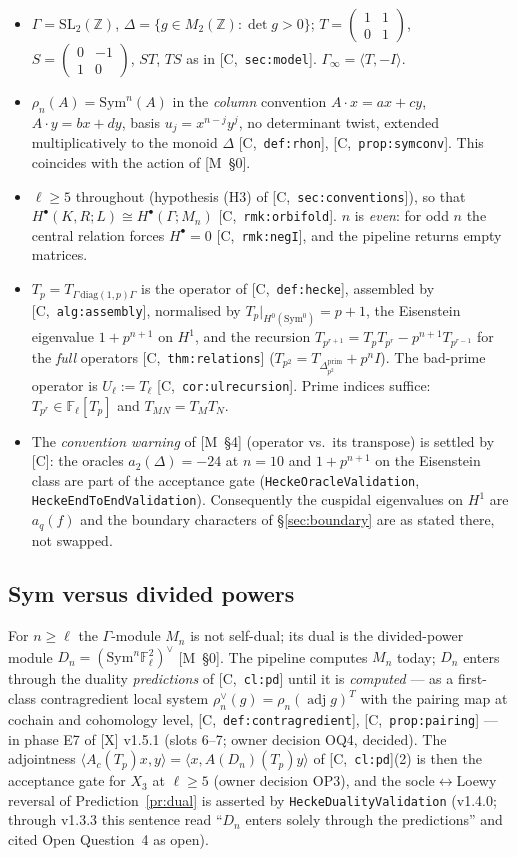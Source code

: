 \documentclass[11pt]{article}
\theoremstyle{remark}
\newcommand{\F}{\mathbb{F}}
\newcommand{\Z}{\mathbb{Z}}
\newcommand{\SL}{\mathrm{SL}}
\newcommand{\Sym}{\mathrm{Sym}}
\newcommand{\Ga}{\Gamma}
\newcommand{\De}{\Delta}
\newcommand{\Fl}{\F_\ell}
\newcommand{\smat}[4]{\begin{pmatrix} #1 & #2 \\ #3 & #4 \end{pmatrix}}
\newcommand{\Mn}{M_n}
\newcommand{\Dn}{D_n}
\newcommand{\HA}[1]{[C,~\texttt{#1}]}      %
\newcommand{\Mnote}[1]{[M~\S#1]}            %
\begin{document}
\begin{itemize}
\item $\Ga=\SL_2(\Z)$, $\De=\{g\in M_2(\Z):\det g>0\}$; $T=\smat1101$, $S=\smat0{-1}10$,
  $ST$, $TS$ as in \HA{sec:model}. $\Ga_\infty=\langle T,-I\rangle$.
\item $\rho_n(A)=\Sym^n(A)$ in the \emph{column} convention $A\cdot x=ax+cy$, $A\cdot y=bx+dy$,
  basis $u_j=x^{n-j}y^j$, no determinant twist, extended multiplicatively to the monoid $\De$
  \HA{def:rhon}, \HA{prop:symconv}. This coincides with the action of \Mnote{0}.
\item $\ell\ge5$ throughout (hypothesis (H3) of \HA{sec:conventions}), so that
  $H^\bullet(K,R;L)\cong H^\bullet(\Ga;\Mn)$ \HA{rmk:orbifold}. $n$ is \emph{even}: for odd $n$
  the central relation forces $H^\bullet=0$ \HA{rmk:negI}, and the pipeline returns empty
  matrices.
\item $T_p=T_{\Ga\,\mathrm{diag}(1,p)\Ga}$ is the operator of \HA{def:hecke}, assembled by
  \HA{alg:assembly}, normalised by $T_p|_{H^0(\Sym^0)}=p+1$, the Eisenstein eigenvalue
  $1+p^{n+1}$ on $H^1$, and the recursion
  $T_{p^{r+1}}=T_pT_{p^r}-p^{n+1}T_{p^{r-1}}$ for the \emph{full} operators \HA{thm:relations}
  ($T_{p^2}=T_{\De^{\mathrm{prim}}_{p^2}}+p^nI$). The bad-prime operator is $U_\ell:=T_\ell$
  \HA{cor:ulrecursion}. Prime indices suffice: $T_{p^r}\in\Fl[T_p]$ and $T_{MN}=T_MT_N$.
\item The \emph{convention warning} of \Mnote{4} (operator vs.\ its transpose) is settled by
  [C]: the oracles $a_2(\De)=-24$ at $n=10$ and $1+p^{n+1}$ on the Eisenstein class are part of
  the acceptance gate (\texttt{HeckeOracleValidation}, \texttt{HeckeEndToEndValidation}).
  Consequently the cuspidal eigenvalues on $H^1$ are $a_q(f)$ and the boundary characters of
  \S\ref{sec:boundary} are as stated there, not swapped.
\end{itemize}

\subsection{Sym versus divided powers}\label{sec:symdiv}
For $n\ge\ell$ the $\Ga$-module $\Mn$ is not self-dual; its dual is the divided-power module
$\Dn=(\Sym^n\Fl^2)^\vee$ \Mnote{0}. The pipeline computes $\Mn$ today; $\Dn$ enters through
the duality \emph{predictions} of \HA{cl:pd} until it is \emph{computed} --- as a first-class
contragredient local system $\rho_n^\vee(g)=\rho_n(\operatorname{adj}g)^{T}$ with the pairing map
at cochain and cohomology level, \HA{def:contragredient}, \HA{prop:pairing} --- in phase E7 of
[X] v1.5.1 (slots 6--7; owner decision OQ4, decided). The adjointness
$\langle A_c(T_p)x,y\rangle=\langle x,A(\Dn)(T_p)y\rangle$ of \HA{cl:pd}(2) is then the
acceptance gate for $X_3$ at $\ell\ge5$ (owner decision OP3), and the socle$\leftrightarrow$Loewy
reversal of Prediction~\ref{pr:dual} is asserted by \texttt{HeckeDualityValidation} (v1.4.0;
through v1.3.3 this sentence read ``$\Dn$ enters solely through the predictions'' and cited Open
Question~4 as open).
\end{document}
